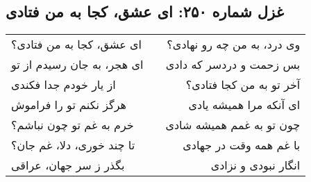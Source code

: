 \begin{center}
\section*{غزل شماره ۲۵۰: ای عشق، کجا به من فتادی}
\label{sec:250}
\begin{longtable}{l p{0.5cm} r}
ای عشق، کجا به من فتادی؟
&&
وی درد، به من چه رو نهادی؟
\\
ای هجر، به جان رسیدم از تو
&&
بس زحمت و دردسر که دادی
\\
از یار خودم جدا فکندی
&&
آخر تو به من کجا فتادی؟
\\
هرگز نکنم تو را فراموش
&&
ای آنکه مرا همیشه یادی
\\
خرم به غم تو چون نباشم؟
&&
چون تو به غمم همیشه شادی
\\
تا چند خوری، دلا، غم جان؟
&&
با غم همه وقت در جهادی
\\
بگذر ز سر جهان، عراقی
&&
انگار نبودی و نزادی
\\
\end{longtable}
\end{center}
